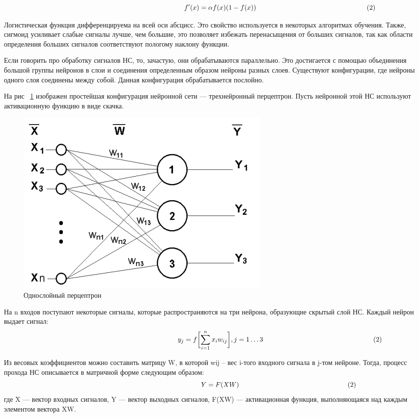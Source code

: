 \documentclass[a4paper,english,russian]{G2-105}
\begin{document}
\[
\ \hspace*{66mm} f'(x) = \alpha f(x) (1 - f(x)) \ \hspace*{56mm} (2)
\] 
\par Логистическая функция дифференцируема на всей оси абсцисс. Это свойство используется в некоторых алгоритмах обучения. Также, сигмоид усиливает слабые сигналы лучше, чем большие, это позволяет избежать перенасыщения от больших сигналов, так как области определения больших сигналов соответствуют пологому наклону функции.   
\par Если говорить про обработку сигналов НС, то, зачастую, они обрабатываются параллельно. Это достигается с помощью объединения большой группы нейронов в слои и соединения определенным образом нейроны разных слоев. Существуют конфигурации, где нейроны одного слоя соединены между собой. Данная конфигурация обрабатывается послойно.
\par На рис ~\ref{perceptron} изображен простейшая конфигурация нейронной сети --- трехнейронный перцептрон. Пусть нейронной этой НС используют активационную функцию в виде скачка. 
\begin{figure}
    \includegraphics[width=0.4\linewidth]{perceptron.png}
    \caption{Однослойный перцептрон}
	\label{perceptron}
\end{figure}
\par На n входов поступают некоторые сигналы, которые распространяются на три нейрона, образующие скрытый слой НС. Каждый нейрон выдает сигнал:
\[
\ \hspace*{66mm} y_j = f\biggl[\sum_{i=1}^n x_i w_{ij} \biggr], j=1 \dots 3  \ \hspace*{56mm} (2)
\] 
\par Из весовых коэффициентов можно составить матрицу W, в которой wij -- вес i-того входного сигнала в j-том нейроне. Тогда, процесс прохода НС описывается в матричной форме следующим образом:
\[
\ \hspace*{66mm} Y=F(XW)  \ \hspace*{56mm} (2)
\] 
где X --- вектор входных сигналов, Y --- вектор выходных сигналов, F(XW) --- активационная функция, выполняющаяся над каждым элементом вектора XW.
\end{document}
